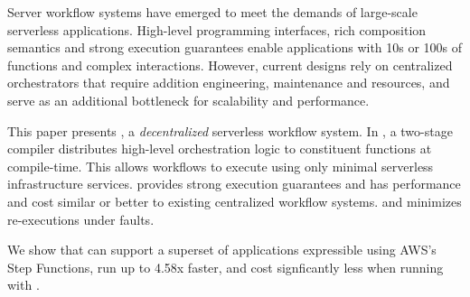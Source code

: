 Server workflow systems have emerged to meet the demands of large-scale
serverless applications. High-level programming interfaces, rich composition
semantics and strong execution guarantees enable applications with 10s or 100s
of functions and complex interactions. However, current designs rely on
centralized orchestrators that require addition engineering, maintenance and
resources, and serve as an additional bottleneck for scalability and
performance.

This paper presents \name{}, a \emph{decentralized} serverless workflow system.
In \name{}, a two-stage compiler distributes high-level orchestration logic to
constituent functions at compile-time.  This allows workflows to execute using
only minimal serverless infrastructure services.
\name{} provides strong execution guarantees and has performance and cost similar or better to existing centralized workflow systems.
and minimizes re-executions under faults.

We show that \name{} can support a superset of applications expressible using
AWS's Step Functions, run up to 4.58x faster, and cost signficantly less when
running with \name{}.
